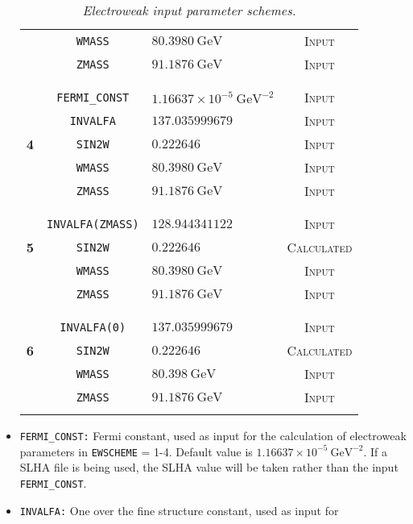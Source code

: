 \documentclass[english,12pt]{article}
\begin{document}
\begin{itemize}
\begin{table}[t!]
\begin{center}
\begin{tabular}{c|c|l|c}
 &{\tt WMASS} & $80.3980 \ \mathrm{GeV}$ & \textsc{Input}\\
 & {\tt ZMASS} & $91.1876 \ \mathrm{GeV}$ & \textsc{Input}\\
&&&\\
\hline
&&&\\
 &{\tt  FERMI\_CONST} & $1.16637 \times 10^{-5} \ \mathrm{GeV}^{-2}$ & \textsc{Input}\\
 &{\tt  INVALFA} & $137.035999679$ & \textsc{Input}\\
\bf 4 &{\tt  SIN2W} & $0.222646$ & \textsc{Input}\\
 &{\tt  WMASS} & $80.3980 \ \mathrm{GeV}$ & \textsc{Input}\\
 &{\tt  ZMASS} & $91.1876 \ \mathrm{GeV}$ & \textsc{Input}\\
&&&\\
\hline
&&&\\
 &{\tt  INVALFA(ZMASS)} & $ 128.944341122$ & \textsc{Input}\\
\bf 5 &{\tt  SIN2W} & $0.222646$ & \textsc{Calculated}\\
 &{\tt  WMASS} & $80.3980 \ \mathrm{GeV}$ & \textsc{Input}\\
 &{\tt  ZMASS} & $91.1876 \ \mathrm{GeV}$ & \textsc{Input}\\
&&&\\
\hline
&&&\\
 &{\tt  INVALFA(0)} & $137.035999679$ & \textsc{Input}\\
\bf 6 &{\tt  SIN2W} & $0.222646$ & \textsc{Calculated}\\
 &{\tt  WMASS} & $80.398 \ \mathrm{GeV}$ & \textsc{Input}\\
 &{\tt  ZMASS} & $91.1876 \ \mathrm{GeV}$ & \textsc{Input}\\
&&&\\
\end{tabular}
\caption {\em  Electroweak input parameter schemes.}
\vspace{0.2cm}
\label{tab:Schemes}
\end{center}
\end{table}
\item {\tt FERMI\_CONST:} Fermi constant, used as input for the calculation of
electroweak parameters in {\tt EWSCHEME} = 1-4. Default value is $1.16637 \times
10^{-5} \ \mathrm{GeV}^{-2}$.  If a SLHA file is being used, the SLHA value will
be taken rather than the input {\tt FERMI\_CONST}. 
\item {\tt INVALFA:} One over the fine structure constant, used as input for

\end{itemize}
\end{document}
